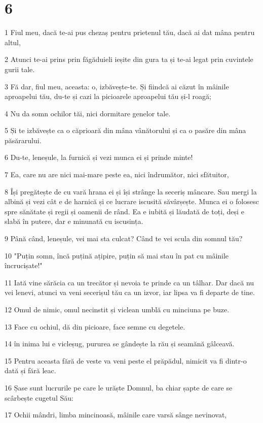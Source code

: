 \chapter{6}

\par 1 Fiul meu, dacă te-ai pus chezaș pentru prietenul tău, dacă ai dat mâna pentru altul,
\par 2 Atunci te-ai prins prin făgăduieli ieșite din gura ta și te-ai legat prin cuvintele gurii tale.
\par 3 Fă dar, fiul meu, aceasta: o, izbăvește-te. Și fiindcă ai căzut în mâinile aproapelui tău, du-te și cazi la picioarele aproapelui tău și-l roagă;
\par 4 Nu da somn ochilor tăi, nici dormitare genelor tale.
\par 5 Și te izbăvește ca o căprioară din mâna vânătorului și ca o pasăre din mâna păsărarului.
\par 6 Du-te, leneșule, la furnică și vezi munca ei și prinde minte!
\par 7 Ea, care nu are nici mai-mare peste ea, nici îndrumător, nici sfătuitor,
\par 8 Își pregătește de cu vară hrana ei și își strânge la seceriș mâncare. Sau mergi la albină și vezi cât e de harnică și ce lucrare iscusită săvârșește. Munca ei o folosesc spre sănătate și regii și oamenii de rând. Ea e iubită și lăudată de toți, deși e slabă în putere, dar e minunată cu iscusința.
\par 9 Până când, leneșule, vei mai sta culcat? Când te vei scula din somnul tău?
\par 10 "Puțin somn, încă puțină ațipire, puțin să mai stau în pat cu mâinile încrucișate!"
\par 11 Iată vine sărăcia ca un trecător și nevoia te prinde ca un tâlhar. Dar dacă nu vei lenevi, atunci va veni secerișul tău ca un izvor, iar lipsa va fi departe de tine.
\par 12 Omul de nimic, omul necinstit și viclean umblă cu minciuna pe buze.
\par 13 Face cu ochiul, dă din picioare, face semne cu degetele.
\par 14 în inima lui e vicleșug, pururea se gândește la rău și seamănă gâlceavă.
\par 15 Pentru aceasta fără de veste va veni peste el prăpădul, nimicit va fi dintr-o dată și fără leac.
\par 16 Șase sunt lucrurile pe care le urăște Domnul, ba chiar șapte de care se scârbește cugetul Său:
\par 17 Ochii mândri, limba mincinoasă, mâinile care varsă sânge nevinovat,
